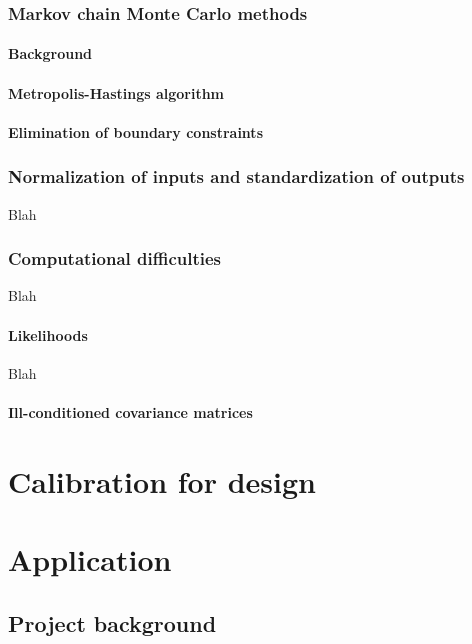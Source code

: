 \documentclass{article}
\begin{document}
\subsubsection{Markov chain Monte Carlo methods}

\paragraph{Background}

\paragraph{Metropolis-Hastings algorithm}

\paragraph{Elimination of boundary constraints}

\subsubsection{Normalization of inputs and standardization of outputs}
Blah

\subsubsection{Computational difficulties}
Blah

\paragraph{Likelihoods}
Blah

\paragraph{Ill-conditioned covariance matrices}

\section{Calibration for design}



\section{Application}

\subsection{Project background}
\end{document}
